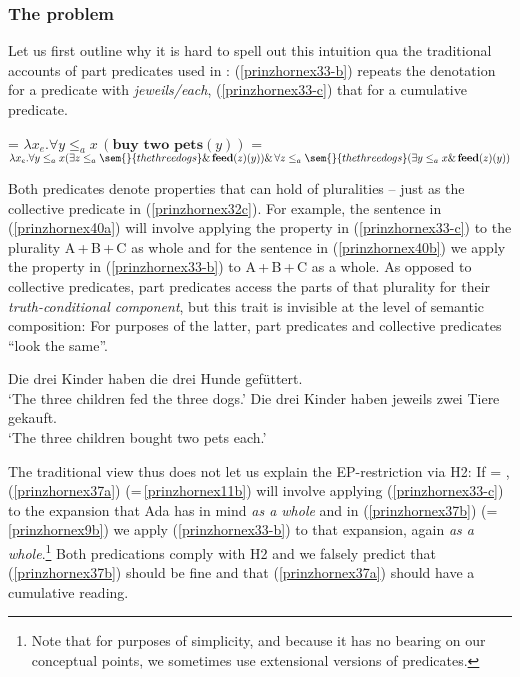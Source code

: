 \documentclass[output=paper,colorlinks,citecolor=brown,
]{langscibook}
\begin{document}
\subsubsection{The problem}

Let us first outline why it is hard to spell out this intuition qua the traditional accounts of part predicates used in : (\ref{prinzhornex33-b}) repeats the denotation for a predicate with \textit{jeweils/each}, (\ref{prinzhornex33-c}) that for a cumulative predicate.

\ea \label{prinzhornexden}
\ea {} = $\lambda x_{e}. \forall y \le_{a} x \,(\textbf{buy  two pets}(y))$\label{prinzhornex33-b}
\ex {} = $\lambda x_{e}. \forall y \le_{a} x (\exists z \le_{a} \sem{}{the three dogs} \&\, \textbf{feed}(z)(y)) \&\, \forall z \le_{a} \sem{}{the three dogs} (\exists y \le_{a} x \& \,\textbf{feed}(z)(y))$ \label{prinzhornex33-c}
\z\z

Both predicates denote properties that can hold of pluralities -- just as the collective predicate in (\ref{prinzhornex32c}). For example, the sentence in (\ref{prinzhornex40a}) will involve applying the property in (\ref{prinzhornex33-c}) to the plurality A\,+\,B\,+\,C as whole and  for the sentence in (\ref{prinzhornex40b}) we apply the property in (\ref{prinzhornex33-b}) to A\,+\,B\,+\,C as a whole. As opposed to collective predicates, part predicates access the parts of that plurality for their \textit{truth-conditional component}, but this trait is invisible at the level of semantic composition: For purposes of the latter, part predicates and collective predicates “look the same”. 



\ea \label{prinzhornex40}
\ea Die drei Kinder haben die drei Hunde gefüttert.\\
`The three children fed the three dogs.' \label{prinzhornex40a}
\ex Die drei Kinder haben jeweils zwei Tiere gekauft.\\
`The three children bought two pets each.' \label{prinzhornex40b}
\z\z

The traditional view thus does not let us explain the EP-restriction via H2: If  = ,  (\ref{prinzhornex37a})  (=\,\ref{prinzhornex11b}) will involve applying (\ref{prinzhornex33-c}) to the expansion that Ada has in mind \textit{as a whole} and in (\ref{prinzhornex37b}) (=\,\ref{prinzhornex9b}) we apply (\ref{prinzhornex33-b}) to that expansion, again \textit{as a whole}.\footnote{Note that for purposes of simplicity, and because it has no bearing on our conceptual points, we sometimes use extensional versions of predicates.} Both  predications comply with H2 and we falsely predict that (\ref{prinzhornex37b}) should be fine and that (\ref{prinzhornex37a}) should have a cumulative reading.
\end{document}
